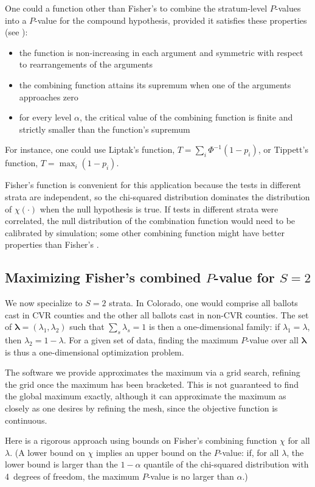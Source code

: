 \documentclass[runningheads]{llncs}
\begin{document}
One could a function other than Fisher's to combine the stratum-level $P$-values into a $P$-value for the compound hypothesis, provided it satisfies these properties (see \cite{pesarinSalmaso10}):
\begin{itemize}
  \item the function is non-increasing in each argument and symmetric with respect to rearrangements of the arguments
  \item the combining function attains its supremum when one of the arguments approaches zero
  \item for every level $\alpha$, the critical value of the combining function is finite and strictly smaller than the function's supremum
\end{itemize}
For instance, one could use Liptak's function, $T = \sum_i \Phi^{-1}(1-p_i)$,
or Tippett's function, $T = \max_i (1-p_i)$.

Fisher's function is convenient for this application because the tests in different strata are independent, so the chi-squared distribution dominates the distribution of $\chi(\cdot)$ when the null hypothesis is true.
If tests in different strata were correlated, the null distribution of the combination function would need to be calibrated by simulation; some other combining function might have better properties than Fisher's \cite{pesarinSalmaso10}.


\subsection{Maximizing Fisher's combined $P$-value for $S=2$}
We now specialize to $S=2$ strata.
In Colorado, one would comprise all ballots cast in CVR counties and the other all ballots cast in non-CVR counties.
The set of $\mathbf{\lambda} = (\lambda_1, \lambda_2)$ such that $\sum_s \lambda_s = 1$ is then a one-dimensional family: if $\lambda_1 = \lambda$, then $\lambda_2 = 1-\lambda$.
For a given set of data, finding the maximum $P$-value over all $\mathbf{\lambda}$
is thus a one-dimensional optimization problem.

The software we provide approximates the maximum via a grid search, refining the
grid once the maximum has been bracketed.
This is not guaranteed to find the global maximum exactly, although it can approximate 
the maximum as closely as one desires by refining the mesh, since the objective function is continuous.

Here is a rigorous approach using bounds on Fisher's combining function $\chi$ for all
$\lambda$. 
(A lower bound on $\chi$ implies an upper bound on the $P$-value: if, for all $\lambda$, the lower bound is 
larger than the $1-\alpha$ quantile of the chi-squared distribution with 4~degrees of freedom, the maximum $P$-value is no larger than $\alpha$.)
\end{document}
